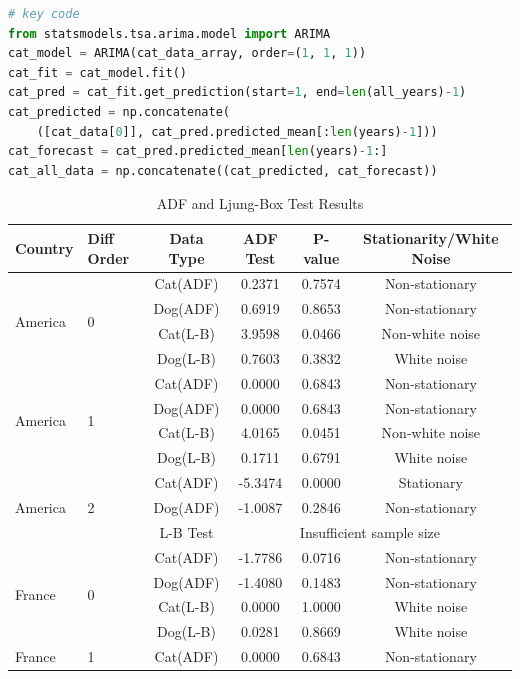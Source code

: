 \documentclass[withoutpreface,bwprint]{cumcmthesis} %
\begin{document}
\begin{lstlisting}[language=python]
# key code
from statsmodels.tsa.arima.model import ARIMA
cat_model = ARIMA(cat_data_array, order=(1, 1, 1))
cat_fit = cat_model.fit()
cat_pred = cat_fit.get_prediction(start=1, end=len(all_years)-1)
cat_predicted = np.concatenate(
    ([cat_data[0]], cat_pred.predicted_mean[:len(years)-1]))
cat_forecast = cat_pred.predicted_mean[len(years)-1:]
cat_all_data = np.concatenate((cat_predicted, cat_forecast))
\end{lstlisting}

\begin{table}[htbp]
\tiny
\centering
\caption{ADF and Ljung-Box Test Results}
\begin{tabular}{llcccc}
\toprule
Country & Diff Order & Data Type & ADF Test & P-value & Stationarity/White Noise \\
\midrule
\multirow{4}{*}{America} & \multirow{4}{*}{0} & Cat(ADF) & 0.2371 & 0.7574 & Non-stationary \\
& & Dog(ADF) & 0.6919 & 0.8653 & Non-stationary \\
& & Cat(L-B) & 3.9598 & 0.0466 & Non-white noise \\
& & Dog(L-B) & 0.7603 & 0.3832 & White noise \\
\midrule
\multirow{4}{*}{America} & \multirow{4}{*}{1} & Cat(ADF) & 0.0000 & 0.6843 & Non-stationary \\
& & Dog(ADF) & 0.0000 & 0.6843 & Non-stationary \\
& & Cat(L-B) & 4.0165 & 0.0451 & Non-white noise \\
& & Dog(L-B) & 0.1711 & 0.6791 & White noise \\
\midrule
\multirow{3}{*}{America} & \multirow{3}{*}{2} & Cat(ADF) & -5.3474 & 0.0000 & Stationary \\
& & Dog(ADF) & -1.0087 & 0.2846 & Non-stationary \\
& & L-B Test & \multicolumn{3}{c}{Insufficient sample size} \\
\midrule
\multirow{4}{*}{France} & \multirow{4}{*}{0} & Cat(ADF) & -1.7786 & 0.0716 & Non-stationary \\
& & Dog(ADF) & -1.4080 & 0.1483 & Non-stationary \\
& & Cat(L-B) & 0.0000 & 1.0000 & White noise \\
& & Dog(L-B) & 0.0281 & 0.8669 & White noise \\
\midrule
\multirow{4}{*}{France} & \multirow{4}{*}{1} & Cat(ADF) & 0.0000 & 0.6843 & Non-stationary \\

\end{tabular}
\end{table}
\end{document}
